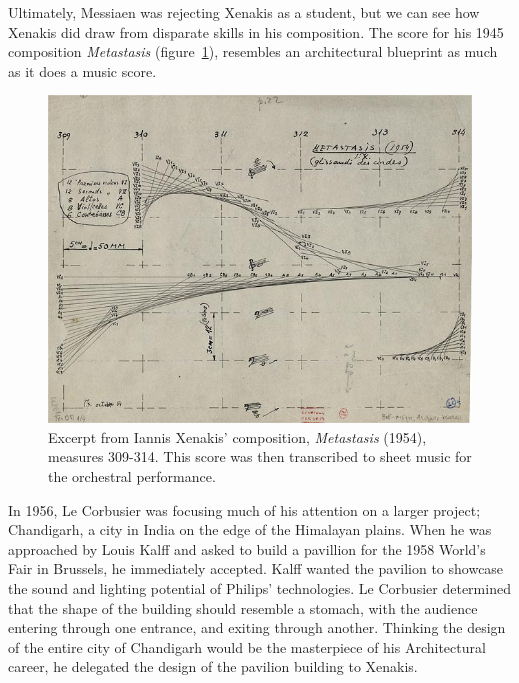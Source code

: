 \documentclass{tufte-book}
\begin{document}
Ultimately, Messiaen was rejecting Xenakis as a student, but we can
see how Xenakis did draw from disparate skills in his composition. The
score for his 1945 composition \textit{Metastasis}
(figure~\ref{fig:metastasis}), resembles an architectural blueprint as
much as it does a music score.

\begin{figure}[h]
  \includegraphics[width=\linewidth]{XenakisMetastasis.jpg}
  \caption{Excerpt from Iannis Xenakis' composition,
    \textit{Metastasis} (1954), measures 309-314. This score was then
    transcribed to sheet music for the orchestral performance.}
  \label{fig:metastasis}
\end{figure}

In 1956, Le Corbusier was focusing much of his attention on a larger
project; Chandigarh, a city in India on the edge of the Himalayan
plains. When he was approached by Louis Kalff and asked to build a
pavillion for the 1958 World's Fair in Brussels, he immediately
accepted. Kalff wanted the pavilion to showcase the sound and lighting
potential of Philips' technologies. Le Corbusier determined that
the shape of the building should resemble a stomach, with the audience
entering through one entrance, and exiting through another. Thinking
the design of the entire city of Chandigarh would be the masterpiece
of his Architectural career,\cite{Flint2013} he delegated the design
of the pavilion building to Xenakis.\cite{Clarke2012}
\end{document}
